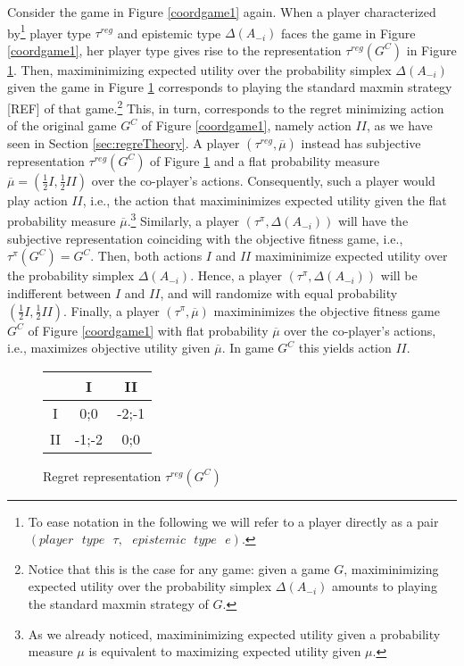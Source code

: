 \documentclass[fleqn,reqno,11pt]{article}
\begin{document}
\begin{example}
Consider the game in Figure \ref{coordgame1} again. When a player characterized by\footnote{To ease notation in the following we will refer to a player directly as a pair $(player \text{ } type \text{ } \tau,\text{ } epistemic\text{ } type \text{ } e)$.} player type $ \tau^{reg} $ and epistemic type $ \Delta(A_{-i}) $ faces the game in Figure \ref{coordgame1}, her player type gives rise to the representation $\tau^{reg}(G^C)$ in Figure \ref{coordgame1reg}. Then, maximinimizing expected utility over the probability simplex $ \Delta(A_{-i}) $ given the game in Figure \ref{coordgame1reg} corresponds to playing the standard maxmin strategy [REF] of that game.\footnote{Notice that this is the case for any game: given a game $G$, maximinimizing expected utility over the probability simplex $ \Delta(A_{-i}) $ amounts to playing the standard maxmin strategy of $G$.} This, in turn, corresponds to the regret minimizing action of the original game $G^C$ of Figure \ref{coordgame1}, namely action $II$, as we have seen in Section \ref{sec:regreTheory}. A player $(\tau^{reg},\overline{\mu})$ instead has subjective representation $\tau^{reg}(G^C)$ of Figure \ref{coordgame1reg} and a flat probability measure $\overline{\mu}=(\frac{1}{2}I,\frac{1}{2}II)$ over the co-player's actions. Consequently, such a player would play action $II$, i.e., the action that maximinimizes expected utility given the flat probability measure $\overline{\mu}$.\footnote{As we already noticed, maximinimizing expected utility given a probability measure $\mu$ is equivalent to maximizing expected utility given $\mu$.} 
Similarly, a player $(\tau^{\pi},\Delta(A_{-i}))$ will have the subjective representation coinciding with the objective fitness game, i.e., $ \tau^{\pi}(G^C)= G^C $. Then, both actions $I$ and $II$ maximinimize expected utility over the probability simplex $ \Delta(A_{-i}) $. Hence, a player $(\tau^{\pi},\Delta(A_{-i}))$ will be indifferent between $I$ and $II$, and will randomize with equal probability $(\frac{1}{2}I,\frac{1}{2}II)$. Finally, a player $(\tau^{\pi},\overline{\mu})$ maximinimizes the objective fitness game $G^C$ of Figure \ref{coordgame1} with flat probability $\overline{\mu}$ over the co-player's actions, i.e., maximizes objective utility given $\overline{\mu}$. In game $G^C$ this yields action $II$. 

\begin{figure}
\begin{center}%
\begin{tabular}{|c|c|c|}
\hline 
 & I & II\tabularnewline
\hline 
\hline 
I & 0;0 & -2;-1\tabularnewline
\hline 
II & -1;-2 & 0;0\tabularnewline
\hline 
\end{tabular}\end{center}

\protect\caption{Regret representation $\tau^{reg}(G^C)$}
\label{coordgame1reg}
\end{figure}

\end{example}
\end{document}
